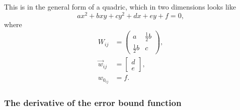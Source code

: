 \documentclass[headings=optiontoheadandtoc,listof=totoc,parskip=full]{scrartcl}
\begin{document}
This is in the general form of a quadric, which in two dimensions looks like
\[
	ax^2 + bxy + cy^2 + dx + ey + f = 0,
\]
where
\begin{align}
	W_{ij} &= \begin{pmatrix}a & \frac{1}{2}b\\\frac{1}{2}b & c\end{pmatrix}, \label{eq:quadric-params-quadratic}\\
	\vec w_{ij} &= \begin{bmatrix}d\\e\end{bmatrix}, \label{eq:quadric-params-linear}\\
	w_{0_{ij}} &= f. \label{eq:quadric-params-constant}
\end{align}

\subsubsection{The derivative of the error bound function}
\end{document}
